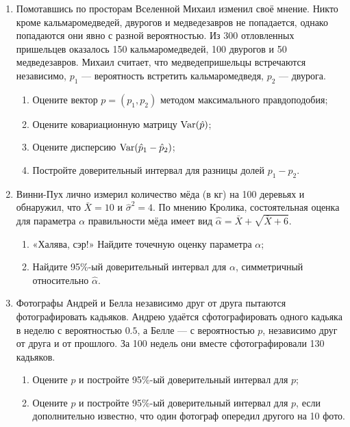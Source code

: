 \begin{enumerate}
\item Помотавшись по просторам Вселенной Михаил изменил своё мнение. Никто кроме
кальмаромедведей, двурогов и медведезавров не попадается, однако попадаются они
явно с разной вероятностью. Из 300 отловленных пришельцев оказалось 150 кальмаромедведей,
100 двурогов и 50 медведезавров. Михаил считает, что медведепришельцы встречаются
независимо, $p_1$ — вероятность встретить кальмаромедведя, $p_2$ — двурога.
\begin{enumerate}
\item Оцените вектор $p = (p_1, p_2)$ методом максимального правдоподобия;
\item Оцените ковариационную матрицу $\operatorname{Var}(\hat p)$;
\item Оцените дисперсию $\operatorname{Var}(\hat p_1 - \hat p_2)$;
\item Постройте доверительный интервал для разницы долей $p_1 - p_2$.
\end{enumerate}

\item Винни-Пух лично измерил количество мёда (в кг) на 100 деревьях и обнаружил, что $\bar X = 10$ и $\hat\sigma^2 = 4$.
По мнению Кролика, состоятельная оценка для параметра $\alpha$ правильности мёда имеет вид $\hat \alpha = \bar X + \sqrt{\bar X + 6}$.

\begin{enumerate}
\item «Халява, сэр!» Найдите точечную оценку параметра $\alpha$;
\item Найдите 95\%-ый доверительный интервал для $\alpha$, симметричный относительно
$\hat\alpha$.
\end{enumerate}

\item Фотографы Андрей и Белла независимо друг от друга пытаются фотографировать кадьяков.
Андрею удаётся сфотографировать одного кадьяка в неделю с вероятностью $0.5$, а Белле — с вероятностью $p$,
независимо друг от друга и от прошлого.
За 100 недель они вместе сфотографировали 130 кадьяков.

\begin{enumerate}
\item Оцените $p$ и постройте 95\%-ый доверительный интервал для $p$;
\item Оцените $p$ и постройте 95\%-ый доверительный интервал для $p$,
если дополнительно известно, что один фотограф опередил другого на 10 фото.
\end{enumerate}
\end{enumerate}

